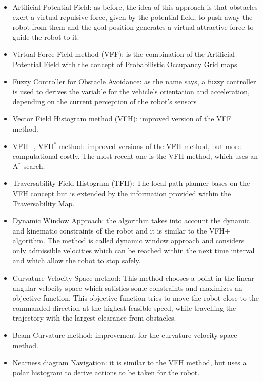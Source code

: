 \begin{itemize}
  \item Artificial Potential Field: as before, the idea of this approach is that
  obstacles exert a virtual repulsive force, given by the potential field, to push
  away the robot from them and the goal position generates a virtual attractive
  force to guide the robot to it.

  \item Virtual Force Field method (VFF): is the combination of the Artificial Potential
  Field with the concept of Probabilistic Occupancy Grid maps.

  \item Fuzzy Controller for Obstacle Avoidance: as the name says, a fuzzy controller
  is used to derives the variable for the vehicle’s orientation and acceleration,
  depending on the current perception of the robot’s sensors

  \item Vector Field Histogram method (VFH): improved version of the VFF method.

  \item VFH+, VFH$^*$ method: improved versions of the VFH method, but more computational costly.
  The most recent one is the VFH method, which uses an A$^*$ search.

  \item Traversability Field Histogram (TFH): The local path planner bases on
  the VFH concept but is extended by the information provided within the Traversability Map.

  \item Dynamic Window Approach: the algorithm takes into account the dynamic and kinematic constraints
  of the robot and it is similar to the VFH+ algorithm. The method is called
  dynamic window approach and considers only admissible velocities which can be
  reached within the next time interval and which allow the robot to stop safely.

  \item Curvature Velocity Space method: This method chooses a point in the linear-angular
  velocity space which satisfies some constraints and maximizes an objective function.
  This objective function tries to move the robot close to the commanded direction at
  the highest feasible speed, while travelling the trajectory with the largest clearance from obstacles.

  \item Beam Curvature method: improvement for the curvature velocity space method.

  \item Nearness diagram Navigation: it is similar to the VFH method, but uses
  a polar histogram to derive actions to be taken for the robot.
\end{itemize}

